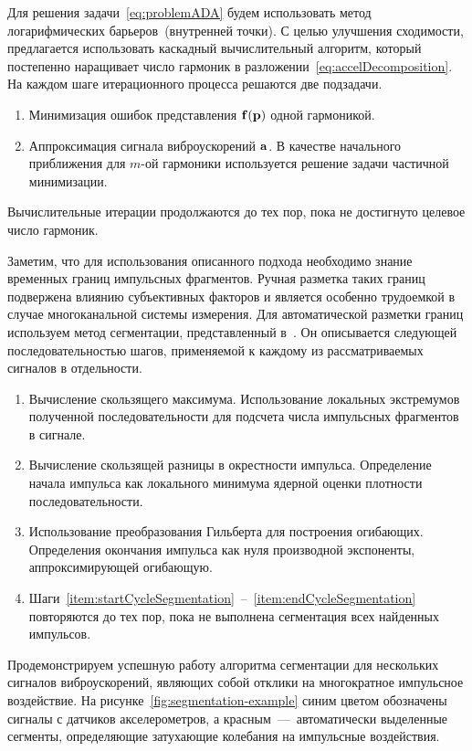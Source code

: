 Для решения задачи~\eqref{eq:problemADA} будем использовать метод логарифмических барьеров~(внутренней точки). С целью улучшения сходимости, предлагается использовать каскадный вычислительный алгоритм, который постепенно наращивает число гармоник в разложении~\eqref{eq:accelDecomposition}. На каждом шаге итерационного процесса решаются две подзадачи.
\begin{enumerate}
	\item Минимизация ошибок представления $ \mathbf{f(\mathbf{p})} $ одной гармоникой. 
	\item Аппроксимация сигнала виброускорений $ \mathbf{a} $. В качестве начального приближения для $ m $-ой гармоники используется решение задачи частичной минимизации. 
\end{enumerate}

Вычислительные итерации продолжаются до тех пор, пока не достигнуто целевое число гармоник. 

Заметим, что для использования описанного подхода необходимо знание временных границ импульсных фрагментов. Ручная разметка таких границ подвержена влиянию субъективных факторов и является особенно трудоемкой в случае многоканальной системы измерения. Для автоматической разметки границ используем метод сегментации, представленный в~\cite{lib:oma:Gasior}. Он описывается следующей последовательностью шагов, применяемой к каждому из рассматриваемых сигналов в отдельности.
\begin{enumerate}
	\item Вычисление скользящего максимума. Использование локальных экстремумов полученной последовательности для подсчета числа импульсных фрагментов в сигнале.
	\item Вычисление скользящей разницы в окрестности импульса. Определение начала импульса как локального минимума ядерной оценки плотности последовательности. \label{item:startCycleSegmentation}
	\item Использование преобразования Гильберта для построения огибающих. Определения окончания импульса как нуля производной экспоненты, аппроксимирующей огибающую. \label{item:endCycleSegmentation}
	\item Шаги~\ref{item:startCycleSegmentation}~--~\ref{item:endCycleSegmentation} повторяются до тех пор, пока не выполнена сегментация всех найденных импульсов. 
\end{enumerate}

Продемонстрируем успешную работу алгоритма сегментации для нескольких сигналов виброускорений, являющих собой отклики на многократное импульсное воздействие. На рисунке~\ref{fig:segmentation-example} синим цветом обозначены сигналы с датчиков акселерометров, а красным~---~автоматически выделенные сегменты, определяющие затухающие колебания на импульсные воздействия. 

